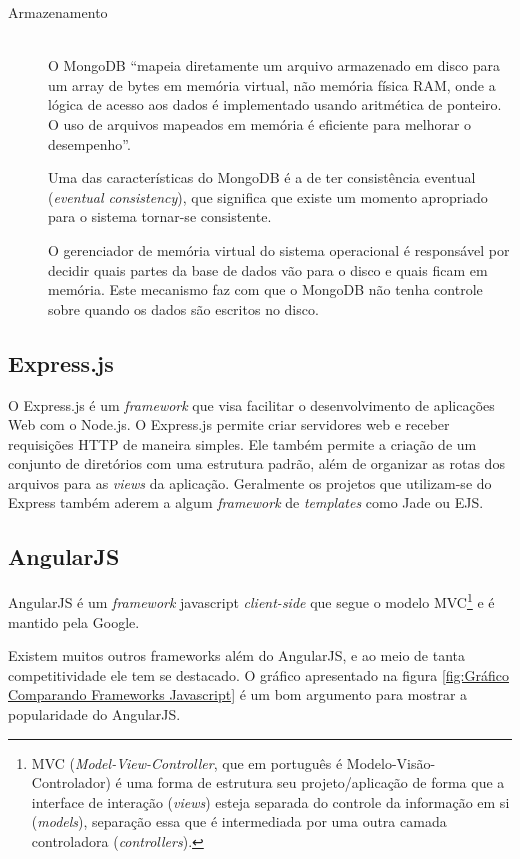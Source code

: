 \begin{description}
\item[Armazenamento] \hfill \\
O MongoDB ``mapeia diretamente um arquivo armazenado em disco para um array de bytes em memória virtual, não memória física RAM, onde a lógica de acesso aos dados é implementado usando aritmética de ponteiro. O uso de arquivos mapeados em memória é eficiente para melhorar o desempenho''\cite{AnaliseNosql}.

Uma das características do MongoDB é a de ter consistência eventual (\textit{eventual consistency}), que significa que  existe um momento apropriado para o sistema tornar-se consistente. \cite{BaseAcid}

O gerenciador de memória virtual do sistema operacional é responsável por decidir quais partes da base de dados vão para o disco e quais ficam em memória. Este mecanismo faz com que o MongoDB não tenha controle sobre quando os dados são escritos no disco\cite{AnalysisNoSQL}.

\end{description}


\subsection{Express.js}
\label{subsec: Express.js}
O Express.js é um \textit{framework} que visa facilitar o desenvolvimento de aplicações Web com o Node.js. O Express.js permite criar servidores web e receber requisições HTTP de maneira simples. Ele também permite a criação de um conjunto de diretórios com uma estrutura padrão, além de organizar as rotas dos arquivos para as \textit{views} da aplicação. Geralmente os projetos que utilizam-se do Express também aderem a algum \textit{framework} de \textit{templates} como Jade ou EJS.

\subsection{AngularJS}
\label{subsec: AngularJS}
AngularJS é um \textit{framework} javascript \textit{client-side} que segue o modelo MVC\footnote{MVC (\textit{Model-View-Controller}, que em português é Modelo-Visão-Controlador) é uma forma de estrutura seu projeto/aplicação de forma que a interface de interação (\textit{views}) esteja separada do controle da informação em si (\textit{models}), separação essa que é intermediada por uma outra camada controladora (\textit{controllers}).} e é mantido pela Google.

Existem muitos outros frameworks além do AngularJS, e ao meio de tanta competitividade ele tem se destacado. O gráfico apresentado na figura \ref{fig:Gráfico Comparando Frameworks Javascript} é um bom argumento para mostrar a popularidade do AngularJS.

